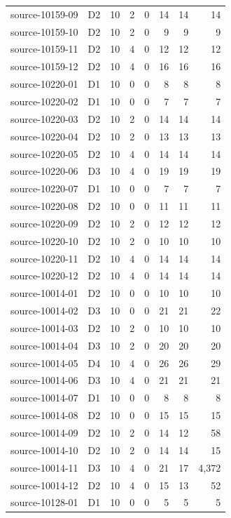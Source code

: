 \begin{longtable}{p{}lrrrrrr}
source-10159-09 & D2 & 10 & 2 & 0 & 14 & 14 & 14\\
source-10159-10 & D2 & 10 & 2 & 0 & 9 & 9 & 9\\
source-10159-11 & D2 & 10 & 4 & 0 & 12 & 12 & 12\\
source-10159-12 & D2 & 10 & 4 & 0 & 16 & 16 & 16\\
source-10220-01 & D1 & 10 & 0 & 0 & 8 & 8 & 8\\
source-10220-02 & D1 & 10 & 0 & 0 & 7 & 7 & 7\\
source-10220-03 & D2 & 10 & 2 & 0 & 14 & 14 & 14\\
source-10220-04 & D2 & 10 & 2 & 0 & 13 & 13 & 13\\
source-10220-05 & D2 & 10 & 4 & 0 & 14 & 14 & 14\\
source-10220-06 & D3 & 10 & 4 & 0 & 19 & 19 & 19\\
source-10220-07 & D1 & 10 & 0 & 0 & 7 & 7 & 7\\
source-10220-08 & D2 & 10 & 0 & 0 & 11 & 11 & 11\\
source-10220-09 & D2 & 10 & 2 & 0 & 12 & 12 & 12\\
source-10220-10 & D2 & 10 & 2 & 0 & 10 & 10 & 10\\
source-10220-11 & D2 & 10 & 4 & 0 & 14 & 14 & 14\\
source-10220-12 & D2 & 10 & 4 & 0 & 14 & 14 & 14\\
source-10014-01 & D2 & 10 & 0 & 0 & 10 & 10 & 10\\
source-10014-02 & D3 & 10 & 0 & 0 & 21 & 21 & 22\\
source-10014-03 & D2 & 10 & 2 & 0 & 10 & 10 & 10\\
source-10014-04 & D3 & 10 & 2 & 0 & 20 & 20 & 20\\
source-10014-05 & D4 & 10 & 4 & 0 & 26 & 26 & 29\\
source-10014-06 & D3 & 10 & 4 & 0 & 21 & 21 & 21\\
source-10014-07 & D1 & 10 & 0 & 0 & 8 & 8 & 8\\
source-10014-08 & D2 & 10 & 0 & 0 & 15 & 15 & 15\\
source-10014-09 & D2 & 10 & 2 & 0 & 14 & 12 & 58\\
source-10014-10 & D2 & 10 & 2 & 0 & 14 & 14 & 15\\
source-10014-11 & D3 & 10 & 4 & 0 & 21 & 17 & 4,372\\
source-10014-12 & D2 & 10 & 4 & 0 & 15 & 13 & 52\\
source-10128-01 & D1 & 10 & 0 & 0 & 5 & 5 & 5\\

\end{longtable}
